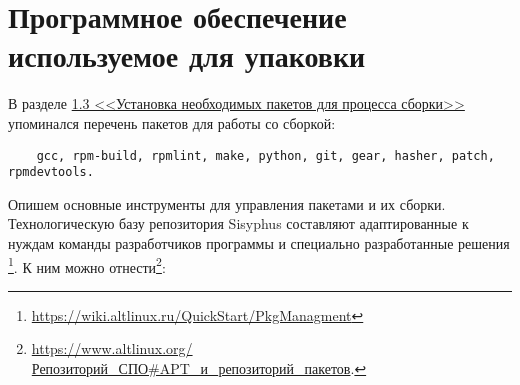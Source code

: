 \chapter{Программное обеспечение используемое для упаковки}\label{software-used-for-packaging}

В разделе \hyperlink{1.3}{1.3 <<Установка необходимых пакетов для процесса сборки>>} 
упоминался перечень пакетов для работы со сборкой:
\begin{verbatim}
	gcc, rpm-build, rpmlint, make, python, git, gear, hasher, patch, rpmdevtools.
\end{verbatim}

Опишем основные инструменты для управления пакетами и их сборки. Технологическую 
базу репозитория Sisyphus составляют адаптированные к нуждам команды разработчиков 
программы и специально разработанные решения%
\footnote{\href{https://wiki.altlinux.ru/QuickStart/PkgManagment\#\%D0\%9E\%D1\%81\%D0\%BD\%D0\%BE\%D0\%B2\%D0\%BD\%D1\%8B\%D0\%B5_\%D0\%B8\%D0\%BD\%D1\%81\%D1\%82\%D1\%80\%D1\%83\%D0\%BC\%D0\%B5\%D0\%BD\%D1\%82\%D1\%8B_\%D0\%B4\%D0\%BB\%D1\%8F_\%D1\%83\%D0\%BF\%D1\%80\%D0\%B0\%D0\%B2\%D0\%BB\%D0\%B5\%D0\%BD\%D0\%B8\%D1\%8F_\%D0\%BF\%D0\%B0\%D0\%BA\%D0\%B5\%D1\%82\%D0\%B0\%D0\%BC\%D0\%B8}{https://wiki.altlinux.ru/QuickStart/PkgManagment}}. 
К ним можно отнести\footnote{\href{https://www.altlinux.org/\%D0\%A0\%D0\%B5\%D0\%BF\%D0\%BE\%D0\%B7\%D0\%B8\%D1\%82\%D0\%BE\%D1\%80\%D0\%B8\%D0\%B9_\%D0\%A1\%D0\%9F\%D0\%9E\#APT_\%D0\%B8_\%D1\%80\%D0\%B5\%D0\%BF\%D0\%BE\%D0\%B7\%D0\%B8\%D1\%82\%D0\%BE\%D1\%80\%D0\%B8\%D0\%B9_\%D0\%BF\%D0\%B0\%D0\%BA\%D0\%B5\%D1\%82\%D0\%BE\%D0\%B2}{https://www.altlinux.org/Репозиторий\_СПО\#APT\_и\_репозиторий\_пакетов}.}:
